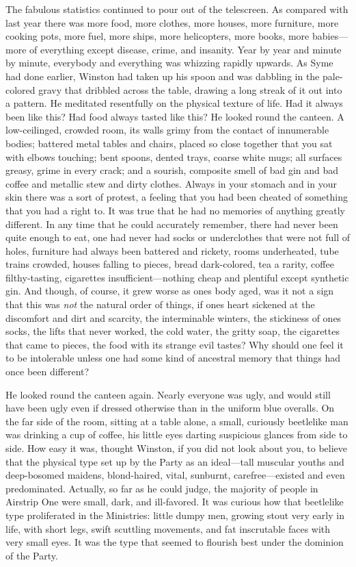 The fabulous statistics continued to pour out of the telescreen. As
compared with last year there was more food, more clothes, more houses,
more furniture, more cooking pots, more fuel, more ships, more
helicopters, more books, more babies---more of everything except
disease, crime, and insanity. Year by year and minute by minute,
everybody and everything was whizzing rapidly upwards. As Syme had done
earlier, Winston had taken up his spoon and was dabbling in the
pale-colored gravy that dribbled across the table, drawing a long streak
of it out into a pattern. He meditated resentfully on the physical
texture of life. Had it always been like this? Had food always tasted
like this? He looked round the canteen. A low-ceilinged, crowded room,
its walls grimy from the contact of innumerable bodies; battered metal
tables and chairs, placed so close together that you sat with elbows
touching; bent spoons, dented trays, coarse white mugs; all surfaces
greasy, grime in every crack; and a sourish, composite smell of bad gin
and bad coffee and metallic stew and dirty clothes. Always in your
stomach and in your skin there was a sort of protest, a feeling that you
had been cheated of something that you had a right to. It was true that
he had no memories of anything greatly different. In any time that he
could accurately remember, there had never been quite enough to eat, one
had never had socks or underclothes that were not full of holes,
furniture had always been battered and rickety, rooms underheated, tube
trains crowded, houses falling to pieces, bread dark-colored, tea a
rarity, coffee filthy-tasting, cigarettes insufficient---nothing cheap
and plentiful except synthetic gin. And though, of course, it grew worse
as one\textquotesingle s body aged, was it not a sign that this was
\emph{not} the natural order of things, if one\textquotesingle s heart
sickened at the discomfort and dirt and scarcity, the interminable
winters, the stickiness of one\textquotesingle s socks, the lifts that
never worked, the cold water, the gritty soap, the cigarettes that came
to pieces, the food with its strange evil tastes? Why should one feel it
to be intolerable unless one had some kind of ancestral memory that
things had once been different?

He looked round the canteen again. Nearly everyone was ugly, and would
still have been ugly even if dressed otherwise than in the uniform blue
overalls. On the far side of the room, sitting at a table alone, a
small, curiously beetlelike man was drinking a cup of coffee, his little
eyes darting suspicious glances from side to side. How easy it was,
thought Winston, if you did not look about you, to believe that the
physical type set up by the Party as an ideal---tall muscular youths and
deep-bosomed maidens, blond-haired, vital, sunburnt, carefree---existed
and even predominated. Actually, so far as he could judge, the majority
of people in Airstrip One were small, dark, and ill-favored. It was
curious how that beetlelike type proliferated in the Ministries: little
dumpy men, growing stout very early in life, with short legs, swift
scuttling movements, and fat inscrutable faces with very small eyes. It
was the type that seemed to flourish best under the dominion of the
Party.

